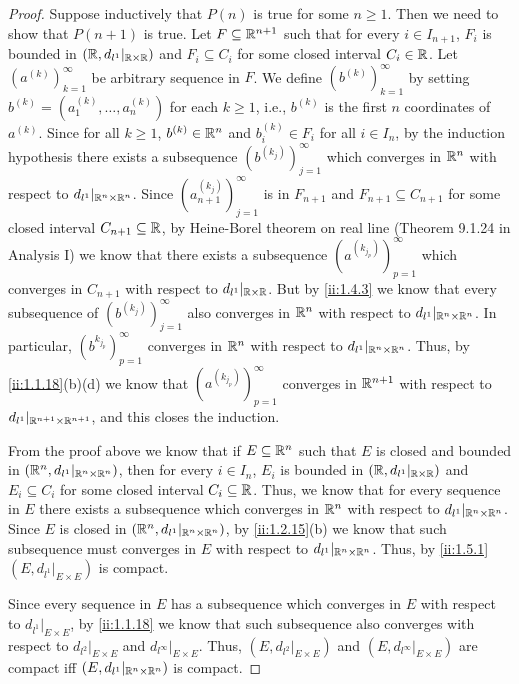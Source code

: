 \begin{proof}
  Suppose inductively that \(P(n)\) is true for some \(n \geq 1\).
  Then we need to show that \(P(n + 1)\) is true.
  Let \(F \subseteq \mathbb{R}^{n + 1}\) such that for every \(i \in I_{n + 1}\), \(F_i\) is bounded in \((\mathbb{R}, d_{l^1}|_{\mathbb{R} \times \mathbb{R}})\) and \(F_i \subseteq C_i\) for some closed interval \(C_i \in \mathbb{R}\).
  Let \((a^{(k)})_{k = 1}^\infty\) be arbitrary sequence in \(F\).
  We define \((b^{(k)})_{k = 1}^\infty\) by setting \(b^{(k)} = (a_1^{(k)}, \dots, a_n^{(k)})\) for each \(k \geq 1\), i.e., \(b^{(k)}\) is the first \(n\) coordinates of \(a^{(k)}\).
  Since for all \(k \geq 1\), \(b^{(k)} \in \mathbb{R}^n\) and \(b_i^{(k)} \in F_i\) for all \(i \in I_n\), by the induction hypothesis there exists a subsequence \((b^{(k_j)})_{j = 1}^\infty\) which converges in \(\mathbb{R}^n\) with respect to \(d_{l^1}|_{\mathbb{R}^n \times \mathbb{R}^n}\).
  Since \((a_{n + 1}^{(k_j)})_{j = 1}^\infty\) is in \(F_{n + 1}\) and \(F_{n + 1} \subseteq C_{n + 1}\) for some closed interval \(C_{n + 1} \subseteq \mathbb{R}\), by Heine-Borel theorem on real line (Theorem 9.1.24 in Analysis I) we know that there exists a subsequence \((a^{(k_{j_p})})_{p = 1}^\infty\) which converges in \(C_{n + 1}\) with respect to \(d_{l^1}|_{\mathbb{R} \times \mathbb{R}}\).
  But by \cref{ii:1.4.3} we know that every subsequence of \((b^{(k_j)})_{j = 1}^\infty\) also converges in \(\mathbb{R}^n\) with respect to \(d_{l^1}|_{\mathbb{R}^n \times \mathbb{R}^n}\).
  In particular, \((b^{k_{j_p}})_{p = 1}^\infty\) converges in \(\mathbb{R}^n\) with respect to \(d_{l^1}|_{\mathbb{R}^n \times \mathbb{R}^n}\).
  Thus, by \cref{ii:1.1.18}(b)(d) we know that \((a^{(k_{j_p})})_{p = 1}^\infty\) converges in \(\mathbb{R}^{n + 1}\) with respect to \(d_{l^1}|_{\mathbb{R}^{n + 1} \times \mathbb{R}^{n + 1}}\), and this closes the induction.

  From the proof above we know that if \(E \subseteq \mathbb{R}^n\) such that \(E\) is closed and bounded in \((\mathbb{R}^n, d_{l^1}|_{\mathbb{R}^n \times \mathbb{R}^n})\), then for every \(i \in I_n\), \(E_i\) is bounded in \((\mathbb{R}, d_{l^1}|_{\mathbb{R} \times \mathbb{R}})\) and \(E_i \subseteq C_i\) for some closed interval \(C_i \subseteq \mathbb{R}\).
  Thus, we know that for every sequence in \(E\) there exists a subsequence which converges in \(\mathbb{R}^n\) with respect to \(d_{l^1}|_{\mathbb{R}^n \times \mathbb{R}^n}\).
  Since \(E\) is closed in \((\mathbb{R}^n, d_{l^1}|_{\mathbb{R}^n \times \mathbb{R}^n})\), by \cref{ii:1.2.15}(b) we know that such subsequence must converges in \(E\) with respect to \(d_{l^1}|_{\mathbb{R}^n \times \mathbb{R}^n}\).
  Thus, by \cref{ii:1.5.1} \((E, d_{l^1}|_{E \times E})\) is compact.

  Since every sequence in \(E\) has a subsequence which converges in \(E\) with respect to \(d_{l^1}|_{E \times E}\), by \cref{ii:1.1.18} we know that such subsequence also converges with respect to \(d_{l^2}|_{E \times E}\) and \(d_{l^\infty}|_{E \times E}\).
  Thus, \((E, d_{l^2}|_{E \times E})\) and \((E, d_{l^\infty}|_{E \times E})\) are compact iff \((E, d_{l^1}|_{\mathbb{R}^n \times \mathbb{R}^n})\) is compact.
\end{proof}

